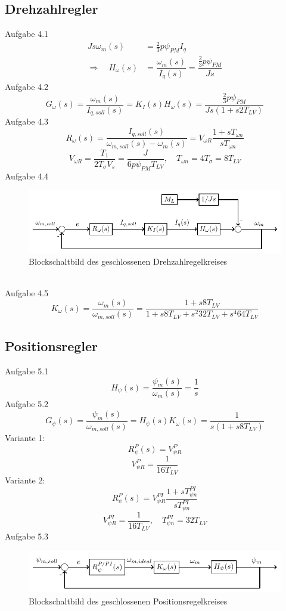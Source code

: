 \documentclass[AMdocument,optGerman]{AMlatex}%
\begin{document}
\subsection{Drehzahlregler}
Aufgabe 4.1
\begin{align*}
Js\omega_{m}(s) &= \frac{2}{3}p\psi_{PM}I_{q} \\
\Rightarrow \quad H_{\omega}(s) &= \dfrac{\omega_{m}(s)}{I_{q}(s)} = \dfrac{\frac{2}{3}p\psi_{PM}}{Js}
\end{align*}
%
Aufgabe 4.2
$$ G_{\omega}(s) = \dfrac{\omega_{m}(s)}{I_{q,soll}(s)} = K_{I}(s)H_{\omega}(s) =  \dfrac{\frac{2}{3}p\psi_{PM}}{Js(1+s2T_{LV})} $$
%
Aufgabe 4.3
$$ R_{\omega}(s) = \dfrac{I_{q,soll}(s)}{\omega_{m,soll}(s) - \omega_{m}(s)} = V_{\omega R}\dfrac{1+sT_{\omega n}}{sT_{\omega n}} $$
$$ V_{\omega R} = \dfrac{T_{1}}{2T_{\sigma}V_{s}} = \dfrac{J}{6p\psi_{PM}T_{LV}}, \quad T_{\omega n} = 4T_{\sigma} = 8T_{LV} $$
%
Aufgabe 4.4
\begin{figure}[htb]%
	\centering%
	\includegraphics[width=120mm]{Drehzahlregler}\par%
	\caption{Blockschaltbild des geschlossenen Drehzahlregelkreises}%
	\label{fig:MyImage}%
\end{figure}%
\\
% 
Aufgabe 4.5
$$ K_{\omega}(s) = \dfrac{\omega_{m}(s)}{\omega_{m,soll}(s)} = \dfrac{1+s8T_{LV}}{1+s8T_{LV}+s^{2}32T_{LV}+s^{4}64T_{LV}} $$
%
\subsection{Positionsregler}
% 
Aufgabe 5.1
$$ H_{\psi}(s) = \dfrac{\psi_{m}(s)}{\omega_{m}(s)} = \frac{1}{s} $$
%
Aufgabe 5.2
$$ G_{\psi}(s) = \dfrac{\psi_{m}(s)}{\omega_{m,soll}(s)} = H_{\psi}(s)K_{\omega}(s) = \dfrac{1}{s(1+s8T_{LV})} $$
Variante 1: 
$$ R_{\psi}^{P}(s)=V_{\psi R}^{P} $$
$$ V_{\psi R}^{P} = \dfrac{1}{16T_{LV}} $$
Variante 2: 
$$ R_{\psi}^{P}(s)=V_{\psi R}^{PI}\dfrac{1+sT_{\psi n}^{PI}}{sT_{\psi n}^{PI}} $$
$$ V_{\psi R}^{PI} = \dfrac{1}{16T_{LV}}, \quad T_{\psi n}^{PI} = 32T_{LV} $$
%
Aufgabe 5.3
\begin{figure}[htb]%
	\centering%
	\includegraphics[width=120mm]{Positionsregler}\par%
	\caption{Blockschaltbild des geschlossenen Positionsregelkreises}%
	\label{fig:MyImage}%
\end{figure}%
\end{document}
